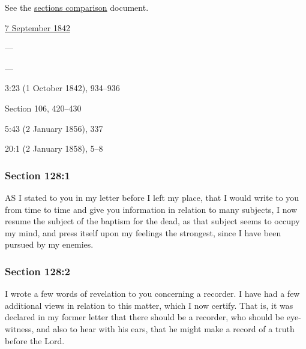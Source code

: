 		See the \href{https://drive.google.com/file/d/1goAvNz8jS4R8slYfMG_db55Ty2z_vmgK/view?usp=sharing}{sections comparison} document.
	
		\begin{compactdesc}
			\item[JSP] \hyperref[EMS-1842-JS-7-SEP-1842]{7 September 1842}
			\item[BC] ---
			\item[DC 1835] ---
			\item[TS] 3:23 (1 October 1842), 934--936
			\item[DC 1844] Section 106, 420--430
			\item[DN] 5:43 (2 January 1856), 337
			\item[MS] 20:1 (2 January 1858), 5--8
		\end{compactdesc}

	\subsubsection{Section 128:1} %
		\label{DC128-1}

		AS I stated to you in my letter before I left my place, that I would write to you from time to time and give you information in relation to many subjects, I now resume the subject of the baptism for the dead, as that subject seems to occupy my mind, and press itself upon my feelings the strongest, since I have been pursued by my enemies.


	\subsubsection{Section 128:2} %
		\label{DC128-2}

		I wrote a few words of revelation to you concerning a recorder. I have had a few additional views in relation to this matter, which I now certify. That is, it was declared in my former letter that there should be a recorder, who should be eye-witness, and also to hear with his ears, that he might make a record of a truth before the Lord.

